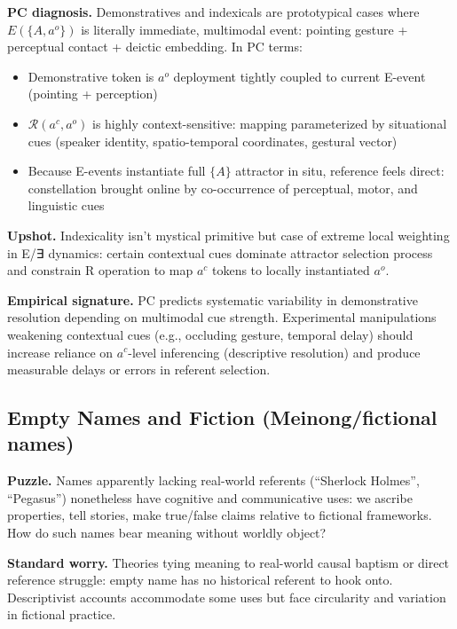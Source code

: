 \documentclass[12pt]{article}
\providecommand{\tightlist}{}   %
\begin{document}
\textbf{PC diagnosis.} Demonstratives and indexicals are prototypical cases where \(E(\{A, a^o\})\) is literally immediate, multimodal event: pointing gesture + perceptual contact + deictic embedding. In PC terms:

\begin{itemize}
\tightlist
\item
  Demonstrative token is \(a^o\) deployment tightly coupled to current E-event (pointing + perception)
\item
  \(\mathcal{R}(a^c, a^o)\) is highly context-sensitive: mapping parameterized by situational cues (speaker identity, spatio-temporal coordinates, gestural vector)
\item
  Because E-events instantiate full \(\{A\}\) attractor in situ, reference feels direct: constellation brought online by co-occurrence of perceptual, motor, and linguistic cues
\end{itemize}

\textbf{Upshot.} Indexicality isn't mystical primitive but case of extreme local weighting in E/∃ dynamics: certain contextual cues dominate attractor selection process and constrain R operation to map \(a^c\) tokens to locally instantiated \(a^o\).

\textbf{Empirical signature.} PC predicts systematic variability in demonstrative resolution depending on multimodal cue strength. Experimental manipulations weakening contextual cues (e.g., occluding gesture, temporal delay) should increase reliance on \(a^c\)-level inferencing (descriptive resolution) and produce measurable delays or errors in referent selection.

\subsection{Empty Names and Fiction (Meinong/fictional names)}\label{empty-names-and-fiction-meinongfictional-names}

\textbf{Puzzle.} Names apparently lacking real-world referents (``Sherlock Holmes'', ``Pegasus'') nonetheless have cognitive and communicative uses: we ascribe properties, tell stories, make true/false claims relative to fictional frameworks. How do such names bear meaning without worldly object?

\textbf{Standard worry.} Theories tying meaning to real-world causal baptism or direct reference struggle: empty name has no historical referent to hook onto. Descriptivist accounts accommodate some uses but face circularity and variation in fictional practice.
\end{document}
